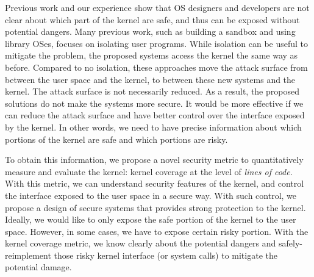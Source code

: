 Previous work and our experience show that OS designers and developers 
are not clear about which part of the kernel are safe, and thus can be 
exposed without potential dangers. 
Many previous work, such as building a sandbox and using library OSes, 
focuses on isolating user programs. While isolation 
can be useful to mitigate the problem, the proposed systems   
access the kernel the same way as before. 
Compared to no isolation, these approaches move
the attack surface from between the user space and the kernel, to 
between these new systems and the kernel. The attack surface
is not necessarily reduced.  
As a result, the proposed solutions do not make the systems more secure. 
%
It would be more effective if we can reduce the attack 
surface and have better control over the interface exposed by the 
kernel. In other words, we need to have precise information about 
which portions of the kernel are safe and which portions are risky.
 
To obtain this information, we propose a novel security metric to 
quantitatively measure and evaluate the kernel: kernel coverage at 
the level of \textit{lines of code}.
%
With this metric, we can understand security features of the kernel, 
and control the interface exposed to the user space in a secure way. 
With such control, we propose a design of secure systems that provides 
strong protection to the kernel. Ideally, we would like to only expose 
the safe portion of the kernel to the user space. However, in some 
cases, we have to expose certain risky portion. With the 
kernel coverage metric, we know clearly about the potential dangers 
and safely-reimplement those risky kernel interface (or system calls) 
to mitigate the potential damage. 
